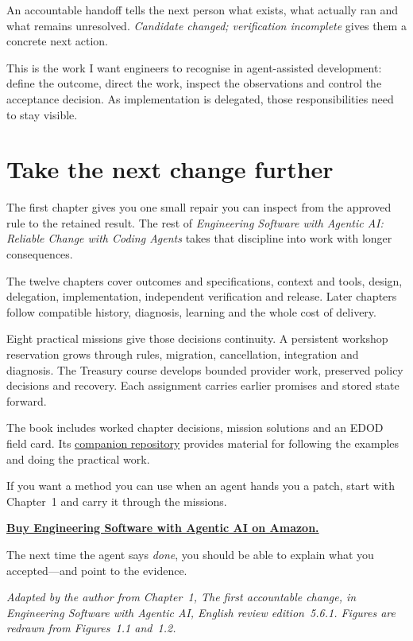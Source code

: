 \documentclass[11pt]{article}
\begin{document}
An accountable handoff tells the next person what exists, what actually ran and what remains unresolved. \emph{Candidate changed; verification incomplete} gives them a concrete next action.

This is the work I want engineers to recognise in agent-assisted development: define the outcome, direct the work, inspect the observations and control the acceptance decision. As implementation is delegated, those responsibilities need to stay visible.

\section{Take the next change further}

The first chapter gives you one small repair you can inspect from the approved rule to the retained result. The rest of \emph{Engineering Software with Agentic AI: Reliable Change with Coding Agents} takes that discipline into work with longer consequences.

The twelve chapters cover outcomes and specifications, context and tools, design, delegation, implementation, independent verification and release. Later chapters follow compatible history, diagnosis, learning and the whole cost of delivery.

Eight practical missions give those decisions continuity. A persistent workshop reservation grows through rules, migration, cancellation, integration and diagnosis. The Treasury course develops bounded provider work, preserved policy decisions and recovery. Each assignment carries earlier promises and stored state forward.

The book includes worked chapter decisions, mission solutions and an EDOD field card. Its \href{https://github.com/popoloni/esa_ai}{companion repository} provides material for following the examples and doing the practical work.

If you want a method you can use when an agent hands you a patch, start with Chapter~1 and carry it through the missions.

\textbf{\href{https://www.amazon.com/dp/B0HSPH86CG}{Buy Engineering Software with Agentic AI on Amazon.}}

The next time the agent says \emph{done}, you should be able to explain what you accepted---and point to the evidence.

\medskip
{\small\itshape Adapted by the author from Chapter~1, The first accountable change, in Engineering Software with Agentic AI, English review edition~5.6.1. Figures are redrawn from Figures~1.1 and~1.2.}
\end{document}
